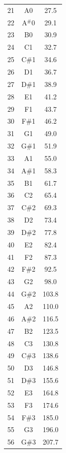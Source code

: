 \documentclass[10pt]{book}
\begin{document}
\footnotesize
\twocolumn
\begin{spacing}{0.99}
\begin{supertabular}{ccc}
\label{MIDI}
21  & A0  &  27.5 \\
22  & A$^\#$0 &  29.1 \\
23  & B0  &  30.9 \\
24  & C1  &  32.7 \\
25  & C\#1 &  34.6 \\
26  & D1  &  36.7 \\
27  & D\#1 &  38.9 \\
28  & E1  &  41.2 \\
29  & F1  &  43.7 \\
30  & F\#1 &  46.2 \\
31  & G1  &  49.0 \\
32  & G\#1 &  51.9  \\
33  & A1  &  55.0  \\
34  & A\#1 &  58.3  \\
35  & B1  &  61.7  \\
36  & C2  &  65.4  \\
37  & C\#2 &  69.3  \\
38  & D2  &  73.4  \\
39  & D\#2 &  77.8  \\
40  & E2  &  82.4  \\
41  & F2  &  87.3  \\
42  & F\#2 &  92.5  \\
43  & G2  &  98.0  \\
44  & G\#2 & 103.8  \\
45  & A2  & 110.0  \\
46  & A\#2 & 116.5  \\
47  & B2  & 123.5  \\
48  & C3  & 130.8  \\
49  & C\#3 & 138.6  \\
50  & D3  & 146.8  \\
51  & D\#3 & 155.6  \\
52  & E3  & 164.8  \\
53  & F3  & 174.6  \\
54  & F\#3 & 185.0  \\
55  & G3  & 196.0  \\
56  & G\#3 & 207.7  \\

\end{supertabular}
\end{spacing}
\end{document}
